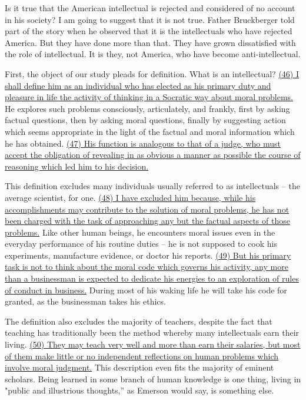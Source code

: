 \qquad Is it true that the American intellectual is rejected and considered of no account in his society? I am going to suggest that it is not true. Father Bruckberger told part of the story when he observed that it is the intellectuals who have rejected America. But they have done more than that. They have grown dissatisfied with the role of intellectual. It is they, not America, who have become anti-intellectual.

\qquad First, the object of our study pleads for definition. What is an intellectual? \ul{(46) I shall define him as an individual who has elected as his primary duty and pleasure in life the activity of thinking in a Socratic way about moral problems.} He explores such problems consciously, articulately, and frankly, first by asking factual questions, then by asking moral questions, finally by suggesting action which seems appropriate in the light of the factual and moral information which he has obtained. \ul{(47) His function is analogous to that of a judge, who must accept the obligation of revealing in as obvious a manner as possible the course of reasoning which led him to his decision.}

\qquad This definition excludes many individuals usually referred to as intellectuals -- the average scientist, for one. \ul{(48) I have excluded him because, while his accomplishments may contribute to the solution of moral problems, he has not been charged with the task of approaching any but the factual aspects of those problems.} Like other human beings, he encounters moral issues even in the everyday performance of his routine duties -- he is not supposed to cook his experiments, manufacture evidence, or doctor his reports. \ul{(49) But his primary task is not to think about the moral code which governs his activity, any more than a businessman is expected to dedicate his energies to an exploration of rules of conduct in business.} During most of his waking life he will take his code for granted, as the businessman takes his ethics.

\qquad The definition also excludes the majority of teachers, despite the fact that teaching has traditionally been the method whereby many intellectuals earn their living. \ul{(50) They may teach very well and more than earn their salaries, but most of them make little or no independent reflections on human problems which involve moral judgment.} This description even fits the majority of eminent scholars. Being learned in some branch of human knowledge is one thing, living in "public and illustrious thoughts,” as Emerson would say, is something else.
